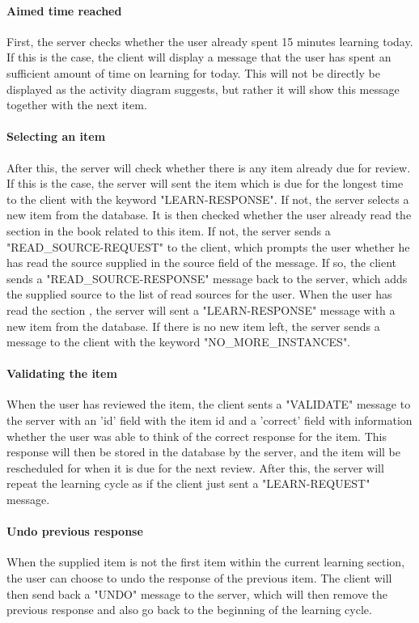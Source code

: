 \paragraph{Aimed time reached} First, the server checks whether the user already spent 15 minutes learning today. If this is the case, the client will display a message that the user has spent an sufficient amount of time on learning for today. This will not be directly be displayed as the activity diagram suggests, but rather it will show this message together with the next item.

\paragraph{Selecting an item} After this, the server will check whether there is any item already due for review. If this is the case, the server will sent the item which is due for the longest time to the client with the keyword "LEARN-RESPONSE". If not, the server selects a new item from the database. It is then checked whether the user already read the section in the book related to this item. If not, the server sends a "READ\_SOURCE-REQUEST" to the client, which prompts the user whether he has read the source supplied in the source field of the message. If so, the client sends a "READ\_SOURCE-RESPONSE" message back to the server, which adds the supplied source to the list of read sources for the user. When the user has read the section , the server will sent a "LEARN-RESPONSE" message with a new item from the database. If there is no new item left, the server sends a message to the client with the keyword "NO\_MORE\_INSTANCES".


\paragraph{Validating the item} When the user has reviewed the item, the client sents a "VALIDATE" message to the server with an 'id' field with the item id and a 'correct' field with information whether the user was able to think of the correct response for the item. This response will then be stored in the database by the server, and the item will be rescheduled for when it is due for the next review. After this, the server will repeat the learning cycle as if the client just sent a "LEARN-REQUEST" message.

\paragraph{Undo previous response} When the supplied item is not the first item within the current learning section, the user can choose to undo the response of the previous item. The client will then send back a "UNDO" message to the server, which will then remove the previous response and also go back to the beginning of the learning cycle.
